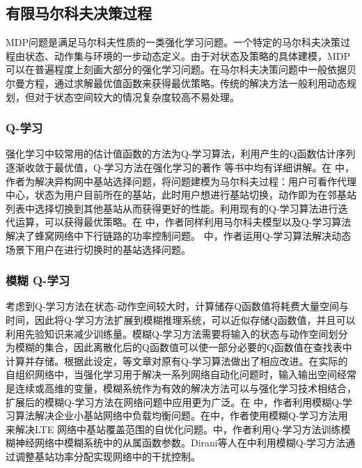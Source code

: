 ﻿\documentclass[11pt,draftclsnofoot,onecolumn,journal,letterpaper]{IEEEtran}
\begin{document}



\subsection{有限马尔科夫决策过程}
MDP问题是满足马尔科夫性质的一类强化学习问题。一个特定的马尔科夫决策过程由状态、动作集与环境的一步动态定义。由于对状态及策略的具体建模，MDP可以在普遍程度上刻画大部分的强化学习问题。在马尔科夫决策问题中一般依据贝尔曼方程，通过求解最优值函数来获得最优策略。传统的解决方法一般利用动态规划，但对于状态空间较大的情况复杂度较高不易处理。

\subsubsection{Q-学习}
强化学习中较常用的估计值函数的方法为Q-学习算法，利用产生的Q函数估计序列逐渐收敛于最优值，Q-学习方法在强化学习的著作
\cite{Sutton2016}等书中均有详细讲解。在\cite{Simsek2015} 中，作者为解决异构网中基站选择问题，将问题建模为马尔科夫过程：用户可看作代理中心，状态为用户目前所在的基站，此时用户想进行基站切换，动作即为在邻基站列表中选择切换到其他基站从而获得更好的性能。利用现有的Q-学习算法进行迭代运算，可以获得最优策略。在
\cite{Ghadimi2017} 中，作者同样利用马尔科夫模型以及Q-学习算法解决了蜂窝网络中下行链路的功率控制问题。
\cite{Dhahri2012}中，作者运用Q-学习算法解决动态场景下用户在进行切换时的基站选择问题。

\subsubsection{模糊 Q-学习}
考虑到Q-学习方法在状态-动作空间较大时，计算储存Q函数值将耗费大量空间与时间，因此将Q-学习方法扩展到模糊推理系统，可以近似存储Q函数值，并且可以利用先验知识来减少训练量。模糊Q-学习方法需要将输入的状态与动作空间划分为模糊的集合，因此离散化后的Q函数值可以使一部分必要的Q函数值在查找表中计算并存储。根据此设定，\cite{Glorennec1997}等文章对原有Q-学习算法做出了相应改进。在实际的自组织网络中，当强化学习用于解决一系列网络自动化问题时，输入输出空间经常是连续或高维的变量，模糊系统作为有效的解决方法可以与强化学习技术相结合，扩展后的模糊Q-学习方法在网络问题中应用更为广泛。在
\cite{Munoz2013} 中，作者利用模糊Q-学习算法解决企业小基站网络中负载均衡问题。在\cite{Razavi2010}中，作者使用模糊Q-学习方法用来解决LTE 网络中基站覆盖范围的自优化问题。\cite{Fan2014}中，作者利用Q-学习方法训练模糊神经网络中模糊系统中的从属函数参数。Dirani等人在\cite{Dirani2010}中利用模糊Q-学习方法通过调整基站功率分配实现网络中的干扰控制。
\end{document}
